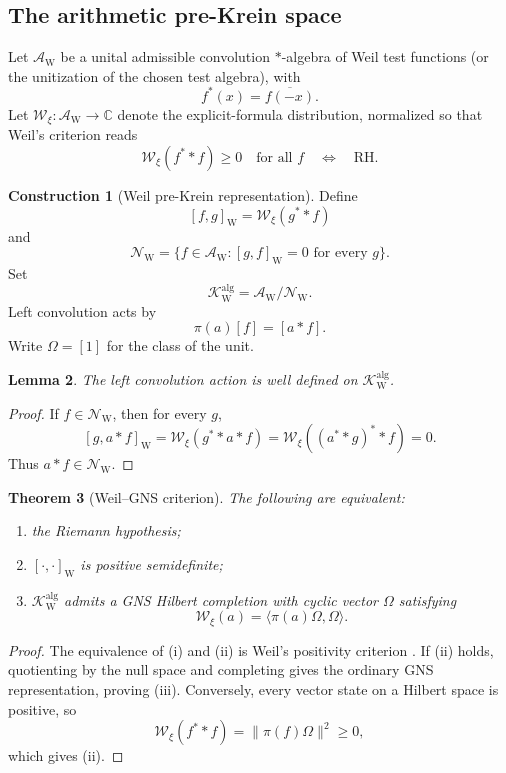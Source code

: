 \documentclass[11pt]{article}
\newtheorem{theorem}{Theorem}[section]
\newtheorem{lemma}[theorem]{Lemma}
\theoremstyle{definition}
\newtheorem{construction}[theorem]{Construction}
\theoremstyle{remark}
\newcommand{\CC}{\mathbb C}
\newcommand{\cA}{\mathcal A}
\newcommand{\WW}{\mathcal W}
\newcommand{\1}{\mathbf 1}
\newcommand{\cK}{\mathcal K}
\begin{document}
\subsection{The arithmetic pre-Krein space}

Let $\cA_{\mathrm W}$ be a unital admissible convolution $*$-algebra of Weil test functions (or the unitization of the chosen test algebra), with
\[
f^*(x)=\overline{f(-x)}.
\]
Let $\WW_\xi:\cA_{\mathrm W}\to\CC$ denote the explicit-formula distribution, normalized so that Weil's criterion reads
\[
\WW_\xi(f^**f)\geq0\quad\text{for all }f
\quad\Longleftrightarrow\quad\mathrm{RH}.
\tag{6.1}
\]

\begin{construction}[Weil pre-Krein representation]
Define
\[
[f,g]_{\mathrm W}=\WW_\xi(g^**f)
\]
and
\[
\mathcal N_{\mathrm W}
=
\{f\in\cA_{\mathrm W}:[g,f]_{\mathrm W}=0\text{ for every }g\}.
\]
Set
\[
\cK_{\mathrm W}^{\mathrm{alg}}
=
\cA_{\mathrm W}/\mathcal N_{\mathrm W}.
\]
Left convolution acts by
\[
\pi(a)[f]=[a*f].
\]
Write $\Omega=[1]$ for the class of the unit.
\end{construction}

\begin{lemma}
The left convolution action is well defined on $\cK_{\mathrm W}^{\mathrm{alg}}$.
\end{lemma}

\begin{proof}
If $f\in\mathcal N_{\mathrm W}$, then for every $g$,
\[
[g,a*f]_{\mathrm W}
=
\WW_\xi(g^**a*f)
=
\WW_\xi((a^**g)^**f)=0.
\]
Thus $a*f\in\mathcal N_{\mathrm W}$.
\end{proof}

\begin{theorem}[Weil--GNS criterion]
The following are equivalent:
\begin{enumerate}[label=(\roman*)]
\item the Riemann hypothesis;
\item $[\cdot,\cdot]_{\mathrm W}$ is positive semidefinite;
\item $\cK_{\mathrm W}^{\mathrm{alg}}$ admits a GNS Hilbert completion with cyclic vector $\Omega$ satisfying
\[
\WW_\xi(a)=\langle\pi(a)\Omega,\Omega\rangle.
\]
\end{enumerate}
\end{theorem}

\begin{proof}
The equivalence of (i) and (ii) is Weil's positivity criterion \cite{Weil1952,Bombieri2000}.  If (ii) holds, quotienting by the null space and completing gives the ordinary GNS representation, proving (iii).  Conversely, every vector state on a Hilbert space is positive, so
\[
\WW_\xi(f^**f)=\|\pi(f)\Omega\|^2\geq0,
\]
which gives (ii).
\end{proof}
\end{document}
